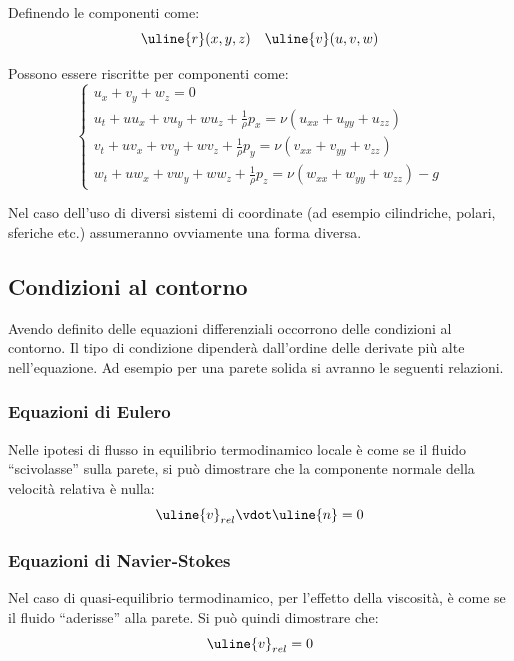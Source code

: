 Definendo le componenti come:
%
	\begin{equation*}
		\uline{r}(x,y,z) \quad \uline{v}(u,v,w)\\
	\end{equation*}
%

Possono essere riscritte per componenti come:
%
	\begin{equation*}
		\left\{
		\begin{gathered}
			u_x + v_y + w_z = 0\\
			u_t + u u_x + v u_y + w u_z + \frac{1}{\rho} p_x = \nu \left( u_{xx} + u_{yy} + u_{zz} \right)\\
			v_t + u v_x + v v_y + w v_z + \frac{1}{\rho} p_y = \nu \left( v_{xx} + v_{yy} + v_{zz} \right)\\
			w_t + u w_x + v w_y + w w_z + \frac{1}{\rho} p_z = \nu \left( w_{xx} + w_{yy} + w_{zz} \right) - g
		\end{gathered}
		\right.
	\end{equation*}
%

Nel caso dell'uso di diversi sistemi di coordinate (ad esempio cilindriche, polari, sferiche etc.) assumeranno ovviamente una forma diversa.

\subsection{Condizioni al contorno}
Avendo definito delle equazioni differenziali occorrono delle condizioni al contorno.
Il tipo di condizione dipenderà dall'ordine delle derivate più alte nell'equazione.
Ad esempio per una parete solida si avranno le seguenti relazioni.

\subsubsection{Equazioni di Eulero}
Nelle ipotesi di flusso in equilibrio termodinamico locale è come se il fluido ``scivolasse'' sulla parete, si può dimostrare che la componente normale della velocità relativa è nulla:
%
	\begin{equation*}
		\uline{v}_{rel} \vdot \uline{n} = 0
	\end{equation*}
%

\subsubsection{Equazioni di Navier-Stokes}
Nel caso di quasi-equilibrio termodinamico, per l'effetto della viscosità, è come se il fluido ``aderisse'' alla parete.
Si può quindi dimostrare che:
%
	\begin{equation*}
		\uline{v}_{rel} = 0
	\end{equation*}
%

